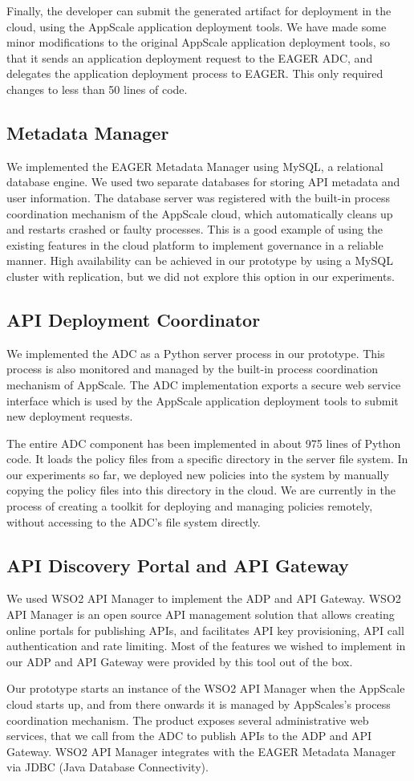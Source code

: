 Finally, the developer can submit the generated artifact for deployment in the cloud, using the AppScale application deployment tools. We have
made some minor modifications to the original AppScale application deployment tools, so that it sends an application deployment request to
the EAGER ADC, and delegates the application deployment process to EAGER. This only required changes to less than 50 lines of code.

\subsection{Metadata Manager}
We implemented the EAGER Metadata Manager using MySQL, a relational database engine. We used two separate databases for storing API metadata
and user information. The database server was registered with the built-in process coordination mechanism of the AppScale cloud, which automatically
cleans up and restarts crashed or faulty processes. This is a good example of using the existing features in the cloud platform to implement
governance in a reliable manner. High availability can be achieved in our prototype by using a MySQL cluster with replication, but we did not explore
this option in our experiments.

\subsection{API Deployment Coordinator}
We implemented the ADC as a Python server process in our prototype. This process is also monitored and managed by the built-in process
coordination mechanism of AppScale. The ADC implementation exports a secure web service interface which is used by the AppScale application 
deployment tools to submit new deployment requests.

The entire ADC component has been implemented in about 975 lines of Python code. It loads the policy files from a specific directory in 
the server file system. In our experiments so far, we deployed new policies into the system by manually copying the policy files into this 
directory in the cloud. We are currently in the process of creating a toolkit for deploying and managing policies remotely, without accessing 
to the ADC's file system directly.

\subsection{API Discovery Portal and API Gateway}
We used WSO2 API Manager to implement the ADP and API Gateway. WSO2 API Manager is an open source API management solution that
allows creating online portals for publishing APIs, and facilitates API key provisioning, API call authentication and rate limiting. Most of the features
we wished to implement in our ADP and API Gateway were provided by this tool out of the box. 

Our prototype starts an instance of the WSO2 API Manager when
the AppScale cloud starts up, and from there onwards it is managed by AppScales's process coordination mechanism. The product exposes several
administrative web services, that we call from the ADC to publish APIs to the ADP and API Gateway. WSO2 API Manager integrates with the EAGER
Metadata Manager via JDBC (Java Database Connectivity).
